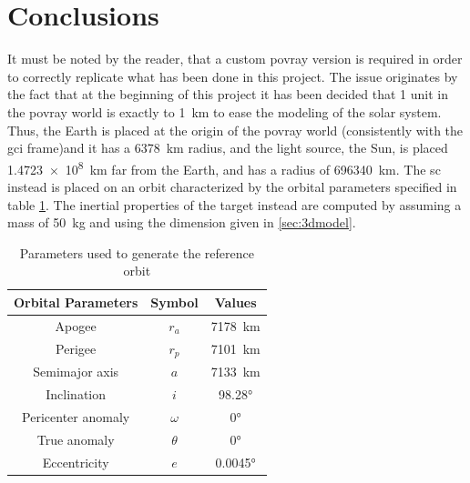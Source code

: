 \section{Conclusions}
It must be noted by the reader, that a custom \acrshort{povray} version is required in order to correctly replicate what has been done in this project.
The issue originates by the fact that at the beginning of this project it has been decided that 1 unit in the \acrshort{povray} world is exactly to \SI{1}{\km} to ease the modeling of the solar system. Thus, the Earth is placed at the origin of the \acrshort{povray} world (consistently with the \acrshort{gci} frame)and it has a \SI{6378}{\km} radius, and the light source, the Sun, is placed \SI{1.4723e8}{\km} far from the Earth, and has a radius of \SI{696340}{\km}.
The \acrshort{sc} instead is placed on an orbit characterized by the orbital parameters specified in table \ref{tab:orbitalParameters}. The inertial properties of the target instead are computed by assuming a mass of \SI{50}{\kg} and using the dimension given in \ref{sec:3dmodel}.

\begin{table}[htbp]
  \centering
  \begin{tabular}{ccc}
    \hline
    \hline
    Orbital Parameters & Symbol   & Values         \\
    \hline
    Apogee             & $r_a$    & \SI{7178}{\km} \\
    \hline
    Perigee            & $r_p$    & \SI{7101}{\km} \\
    \hline
    Semimajor axis     & $a$      & \SI{7133}{\km} \\
    \hline
    Inclination        & $i$      & \ang{98.28}    \\
    \hline
    Pericenter anomaly & $\omega$ & \ang{0}        \\
    \hline
    True anomaly       & $\theta$ & \ang{0}        \\
    \hline
    Eccentricity       & $e$      & \ang{0.0045}   \\
    \hline
    \hline
  \end{tabular}
  \caption{Parameters used to generate the reference orbit \cite{prismaOrbitParameters}}
  \label{tab:orbitalParameters}
\end{table}

